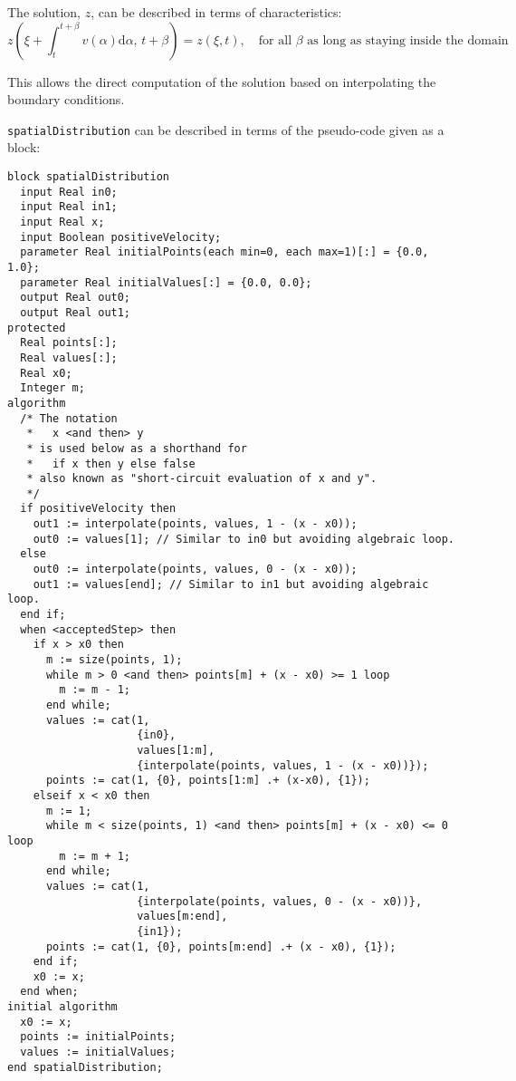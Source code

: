 The solution, $z$, can be described in terms of characteristics:
\begin{equation*}
z(\xi+\int_{t}^{t+\beta}\! v(\alpha) \mathrm{d}\alpha,\, t+\beta) = z(\xi, t), \quad\text{for all $\beta$ as long as staying inside the domain}
\end{equation*}

This allows the direct computation of the solution based on interpolating the boundary conditions.

\lstinline!spatialDistribution! can be described in terms of the pseudo-code given as a block:
\begin{lstlisting}[language=modelica]
block spatialDistribution
  input Real in0;
  input Real in1;
  input Real x;
  input Boolean positiveVelocity;
  parameter Real initialPoints(each min=0, each max=1)[:] = {0.0, 1.0};
  parameter Real initialValues[:] = {0.0, 0.0};
  output Real out0;
  output Real out1;
protected
  Real points[:];
  Real values[:];
  Real x0;
  Integer m;
algorithm
  /* The notation
   *   x <and then> y
   * is used below as a shorthand for
   *   if x then y else false
   * also known as "short-circuit evaluation of x and y".
   */
  if positiveVelocity then
    out1 := interpolate(points, values, 1 - (x - x0));
    out0 := values[1]; // Similar to in0 but avoiding algebraic loop.
  else
    out0 := interpolate(points, values, 0 - (x - x0));
    out1 := values[end]; // Similar to in1 but avoiding algebraic loop.
  end if;
  when <acceptedStep> then
    if x > x0 then
      m := size(points, 1);
      while m > 0 <and then> points[m] + (x - x0) >= 1 loop
        m := m - 1;
      end while;
      values := cat(1,
                    {in0},
                    values[1:m],
                    {interpolate(points, values, 1 - (x - x0))});
      points := cat(1, {0}, points[1:m] .+ (x-x0), {1});
    elseif x < x0 then
      m := 1;
      while m < size(points, 1) <and then> points[m] + (x - x0) <= 0 loop
        m := m + 1;
      end while;
      values := cat(1,
                    {interpolate(points, values, 0 - (x - x0))},
                    values[m:end],
                    {in1});
      points := cat(1, {0}, points[m:end] .+ (x - x0), {1});
    end if;
    x0 := x;
  end when;
initial algorithm
  x0 := x;
  points := initialPoints;
  values := initialValues;
end spatialDistribution;
\end{lstlisting}

